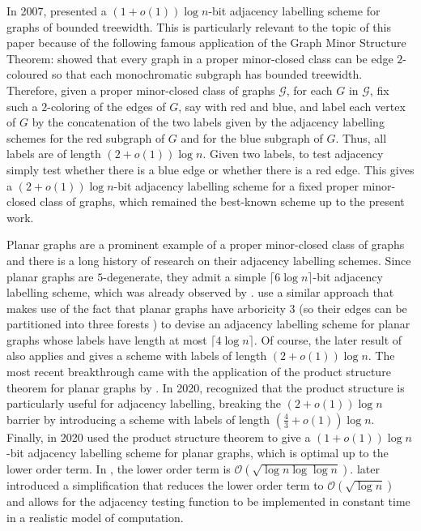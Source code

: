 \documentclass{patmorin}
\newcommand{\vida}[1]{\noindent{\color{pink} VD: #1}}
\newcommand{\calG}{\mathcal{G}}
\newcommand{\Oh}{\mathcal{O}}
\begin{document}

In 2007, \citet{gavoille.labourel:shorter} presented
a $(1+o(1))\log n$-bit adjacency labelling scheme for graphs of bounded treewidth.
This is particularly relevant to the topic of this paper because of the following famous application of the Graph Minor Structure Theorem:
\citet{devos2004} showed that every graph
in a proper minor-closed class can be edge $2$-coloured so that each monochromatic subgraph
has bounded treewidth.
Therefore, given a proper minor-closed class of graphs $\calG$,
for each $G$ in $\calG$, fix such a $2$-coloring of the edges of $G$, say with red and blue, and label each vertex of $G$ by the concatenation of the two labels given by the adjacency labelling schemes for the red subgraph of $G$ and for the blue subgraph of $G$. Thus, all labels are of length $(2+o(1))\log n$.
Given two labels, to test adjacency simply test whether there is a blue edge or whether there is a red edge.
This gives a $(2+o(1))\log n$-bit adjacency labelling scheme for a fixed proper minor-closed class of graphs, which remained the best-known scheme up to the present work.

Planar graphs are a prominent example of a proper minor-closed class of graphs and there is a long history of research
on their adjacency labelling schemes.
Since planar graphs are $5$-degenerate,
they admit a simple $\lceil6\log n\rceil$-bit adjacency labelling scheme, which was already observed by \citet{muller:local}.
\citet{kannan.naor.ea:implicit} use a similar approach that makes use of the fact that planar graphs have arboricity 3 (so their edges can be partitioned into three forests \cite{nash-williams:edge-disjoint}) to devise an adjacency labelling scheme for planar graphs whose labels have length at most $\lceil4\log n\rceil$.
Of course, the later result of \citet{gavoille.labourel:shorter} also applies and gives a scheme with labels of length $(2+o(1))\log n$.
The most recent breakthrough came with the application of the product structure theorem for planar graphs by \citet{dujmovic.joret.ea:planar}.
In 2020, \citet{BGP22} recognized that the product structure is particularly useful for adjacency labelling, breaking the $(2+o(1))\log n$  barrier by introducing a scheme with labels of length $(\frac{4}{3}+o(1))\log n$.
Finally, in 2020 \citet{dujmovic.esperet.ea:adjacency} used the product structure theorem to give a $(1+o(1))\log n$-bit adjacency labelling scheme for planar graphs, which is optimal up to the lower order term. In \cite{dujmovic.esperet.ea:adjacency}, the lower order term is $\Oh(\sqrt{\log n\log\log n})$.  \citet{gawrychowski.janczewski:simpler} later introduced a simplification that reduces the lower order term to $\Oh(\sqrt{\log n})$ and allows for the adjacency testing function to be implemented in constant time in a realistic model of computation.
\end{document}
